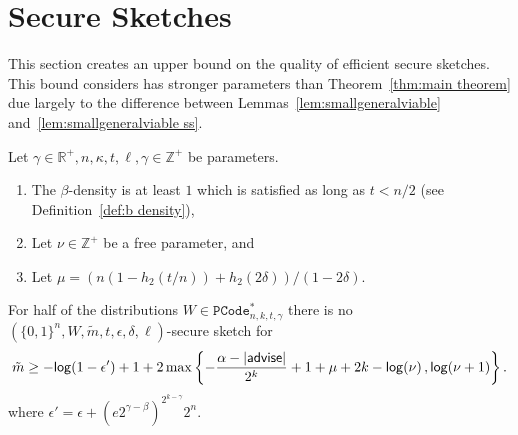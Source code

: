 \section{Secure Sketches}
\label{sec:ss}
This section creates an upper bound on the quality of efficient secure sketches.  This bound considers has stronger parameters than Theorem~\ref{thm:main theorem} due largely to the difference between Lemmas~\ref{lem:smallgeneralviable} and~\ref{lem:smallgeneralviable ss}.

\begin{theorem}
Let $\gamma \in\mathbb{R}^+, n, \kappa, t, \ell, \gamma \in\mathbb{Z}^+$ be parameters.
\begin{enumerate}
\itemsep0em
\item The $\beta$-density is at least $1$ which is  satisfied as long as $t< n/2 $ (see Definition~\ref{def:b density}),
\item Let $\nu \in \mathbb{Z}^+$ be a free parameter, and
\item Let $\mu =(n(1-h_2(t/n)) +h_2(2\delta))/(1-2\delta)$.
\end{enumerate}
For half of the distributions $W\in \mathtt{PCode}_{n, k, t, \gamma}^{*}$ there is no $(\{0,1\}^n, W, \tilde{m}, t, \epsilon,\delta, \ell)$-secure sketch for 
\[
\tilde{m}\ge  -\mathsf{log}\!\left(1-\epsilon'\right) +1 + 2\max\left\{-\frac{\alpha-|{\mathsf{advise}}|}{2^k}+1+\mu+2k-\mathsf{log}\!\left(\nu\right), \mathsf{log}\!\left(\nu+1\right)\right\}.
\]
where $\epsilon' = \epsilon+\left(e2^{\gamma-\beta}\right)^{2^{k-\gamma}}2^n.$
\label{thm:main theorem ss}
\end{theorem}

